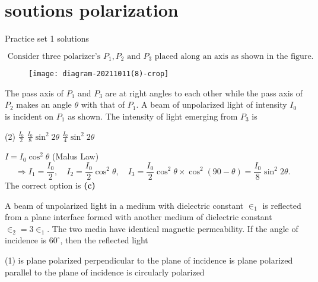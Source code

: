 \chapter{soutions polarization}
\begin{abox}
	Practice set 1 solutions
	\end{abox}
\begin{enumerate}
\begin{minipage}{\textwidth}
	\item $\text { Consider three polarizer's } P_{1}, P_{2} \text { and } P_{3} \text { placed along an axis as shown in the figure. }$\\
	\begin{figure}[H]
		\centering
		\texttt{[image: diagram-20211011(8)-crop]}
	\end{figure}
	The pass axis of $P_{1}$ and $P_{3}$ are at right angles to each other while the pass axis of $P_{2}$ makes an angle $\theta$ with that of $P_{1}$. A beam of unpolarized light of intensity $I_{0}$ is incident on $P_{1}$ as shown. The intensity of light emerging from $P_{3}$ is
\end{minipage}
\begin{tasks}(2)
	\task[\textbf{B.}] $\frac{I_{0}}{2}$
	\task[\textbf{C.}]$\frac{I_{0}}{8} \sin ^{2} 2 \theta$
	\task[\textbf{D.}]$\frac{I_{0}}{4} \sin ^{2} 2 \theta$
\end{tasks}
\begin{answer}
	$I=I_{0} \cos ^{2} \theta$ (Malus Law)
	$$
	\Rightarrow I_{1}=\frac{I_{0}}{2}, \quad I_{2}=\frac{I_{0}}{2} \cos ^{2} \theta, \quad I_{3}=\frac{I_{0}}{2} \cos ^{2} \theta \times \cos ^{2}(90-\theta)=\frac{I_{0}}{8} \sin ^{2} 2 \theta \text {. }
	$$
	The correct option is \textbf{(c)}	
\end{answer}
\begin{minipage}{\textwidth}
	\item A beam of unpolarized light in a medium with dielectric constant $\in_{1}$ is reflected from a plane interface formed with another medium of dielectric constant $\in_{2}=3 \in_{1}$. The two media have identical magnetic permeability. If the angle of incidence is $60^{\circ}$, then the reflected light
\end{minipage}
\begin{tasks}(1)
	\task[\textbf{A.}] is plane polarized perpendicular to the plane of incidence
	\task[\textbf{B.}] is plane polarized parallel to the plane of incidence
	\task[\textbf{C.}]is circularly polarized

\end{tasks}
\end{enumerate}
